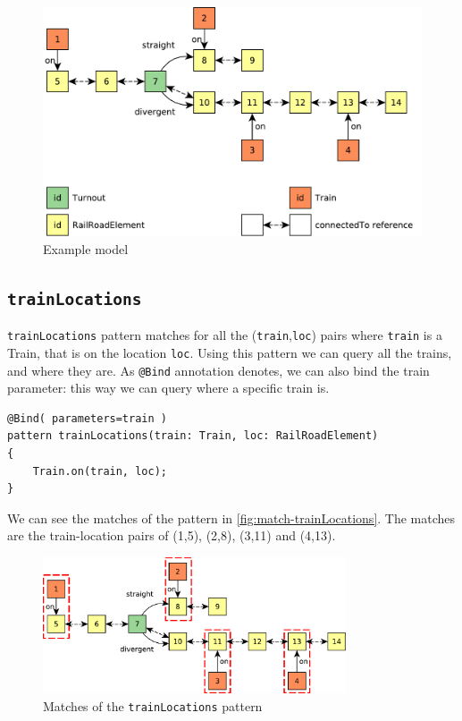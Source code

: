 \begin{figure}[H]
	\begin{center}
		\includegraphics[width=\textwidth]{figures/query-example-model.pdf}
		\caption{Example model}
		\label{fig:query-example-model}
	\end{center}
\end{figure}

\subsection{\texttt{trainLocations}}
\begin{minipage}{\textwidth}

\texttt{trainLocations} pattern matches for all the (\texttt{train},\texttt{loc}) pairs where \texttt{train} is a Train, that is on the location \texttt{loc}.
Using this pattern we can query all the trains, and where they are.
As \texttt{@Bind} annotation denotes, we can also bind the train parameter: this way we can query where a specific train is.
\begin{lstlisting}[language = vql]
@Bind( parameters=train )
pattern trainLocations(train: Train, loc: RailRoadElement)
{
	Train.on(train, loc);
}
\end{lstlisting}
We can see the matches of the pattern in \autoref{fig:match-trainLocations}. The matches are the train-location pairs of (1,5), (2,8), (3,11) and (4,13).
\begin{figure}[H]
	\begin{center}
		\includegraphics[width=0.8\textwidth]{figures/query-example-model-trainloc.pdf}
	\end{center}
	\caption{Matches of the \texttt{trainLocations} pattern}
	\label{fig:match-trainLocations}
\end{figure}

\end{minipage}





